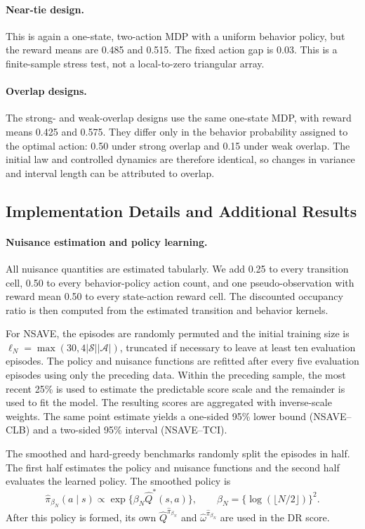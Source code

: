 \documentclass[12pt]{article}
\theoremstyle{remark}\newtheorem{remark}[theorem]{Remark}\theoremstyle{plain}
\begin{document}
\paragraph{Near-tie design.}
This is again a one-state, two-action MDP with a uniform behavior policy,
but the reward means are 0.485 and 0.515.  The fixed action gap is 0.03.
This is a finite-sample stress test, not a local-to-zero triangular array.

\paragraph{Overlap designs.}
The strong- and weak-overlap designs use the same one-state MDP, with reward
means 0.425 and 0.575.  They differ only in the behavior probability assigned
to the optimal action: 0.50 under strong overlap and 0.15 under weak overlap.
The initial law and controlled dynamics are therefore identical, so changes
in variance and interval length can be attributed to overlap.

\subsection{Implementation Details and Additional Results}\label{sec:sim_impl}

\paragraph{Nuisance estimation and policy learning.}
All nuisance quantities are estimated tabularly.  We add 0.25 to every
transition cell, 0.50 to every behavior-policy action count, and one
pseudo-observation with reward mean 0.50 to every state-action reward cell.
The discounted occupancy ratio is then computed from the estimated
transition and behavior kernels.

For NSAVE, the episodes are randomly permuted and the initial training size
is
$\ell_N=\max(30,4|\mathcal S||\mathcal A|)$, truncated if necessary to leave
at least ten evaluation episodes.  The policy and nuisance functions are
refitted after every five evaluation episodes using only the preceding
data.  Within the preceding sample, the most recent 25\% is used to estimate
the predictable score scale and the remainder is used to fit the model.
The resulting scores are aggregated with inverse-scale weights.  The same
point estimate yields a one-sided 95\% lower bound (NSAVE--CLB) and a
two-sided 95\% interval (NSAVE--TCI).

The smoothed and hard-greedy benchmarks randomly split the episodes in half.
The first half estimates the policy and nuisance functions and the second
half evaluates the learned policy.  The smoothed policy is
\[
 \widehat\pi_{\beta_N}(a\mid s)
 \propto \exp\{\beta_N\widehat Q^*(s,a)\},
 \qquad
 \beta_N=\{\log(\lfloor N/2\rfloor)\}^2.
\]
After this policy is formed, its own
$\widehat Q^{\widehat\pi_{\beta_N}}$ and
$\widehat\omega^{\widehat\pi_{\beta_N}}$ are used in the DR score.
\end{document}
